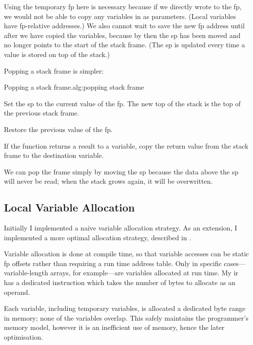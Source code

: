 \documentclass[00-main.tex]{subfiles}
\begin{document}
Using the temporary \gls{fp} here is necessary because if we directly wrote to the \gls{fp}, we would not be able to copy any variables in as parameters.
(Local variables have \gls{fp}-relative addresses.)
We also cannot wait to save the new \gls{fp} address until after we have copied the variables, because by then the \gls{sp} has been moved and no longer points to the start of the stack frame.
(The \gls{sp} is updated every time a value is stored on top of the stack.)

Popping a stack frame is simpler:

\begin{Algorithm}{Popping a stack frame.}{alg:popping stack frame}
\begin{EnumerateAlgorithm}
\item
Set the \gls{sp} to the current value of the \gls{fp}.
The new top of the stack is the top of the previous stack frame.
\item
Restore the previous value of the \gls{fp}.
\item
If the function returns a result to a variable, copy the return value from the stack frame to the destination variable.
\end{EnumerateAlgorithm}
\end{Algorithm}

We can pop the frame simply by moving the \gls{sp} because the data above the \gls{sp} will never be read; when the stack grows again, it will be overwritten.

\subsection{Local Variable Allocation}\label{sec:impl:local variable allocation}

Initially I implemented a naive variable allocation strategy.
As an extension, I implemented a more optimal allocation strategy, described in .

Variable allocation is done at compile time, so that variable accesses can be static \gls{fp} offsets rather than requiring a run time address table.
Only in specific cases---variable-length arrays, for example---are variables allocated at run time.
My \gls{ir} has a dedicated  instruction which takes the number of bytes to allocate as an operand.

Each variable, including temporary variables, is allocated a dedicated byte range in memory; none of the variables overlap.
This safely maintains the programmer's memory model, however it is an inefficient use of memory, hence the later optimisation.
\end{document}
